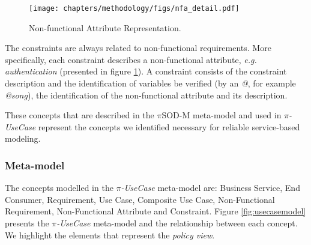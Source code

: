  \begin{figure}[ht!] 
\centering
\texttt{[image: chapters/methodology/figs/nfa\_detail.pdf]}
\caption{Non-functional Attribute Representation.}
\label{fig:nfa_detail} 
\end{figure}

The constraints are always related to non-functional requirements. More
specifically, each constraint describes a non-functional attribute,
\textit{e.g.} \textit{authentication} (presented in figure
\ref{fig:nfa_detail}). A constraint consists of the constraint description and
the identification of variables be verified (by an \textit{@}, for example
\textit{@song}), the identification of the non-functional attribute and its
description. 

  


These concepts that are described in the $\pi$SOD-M  meta-model and used in
\textit{$\pi$-UseCase} represent the concepts we identified necessary
for reliable service-based modeling. 

%  
%  
 
 \subsubsection{Meta-model} 
 
 
The concepts modelled in the \textit{$\pi$-UseCase} meta-model are: {\sc
Business Service, End Consumer, Requirement, Use Case, Composite Use Case, Non-Functional Requirement,
Non-Functional Attribute} and {\sc Constraint}.  Figure
\ref{fig:usecasemodel} presents the \textit{$\pi$-UseCase} meta-model and the
relationship between each concept. We highlight the elements that represent the
\textit{policy view}. 
 
 

